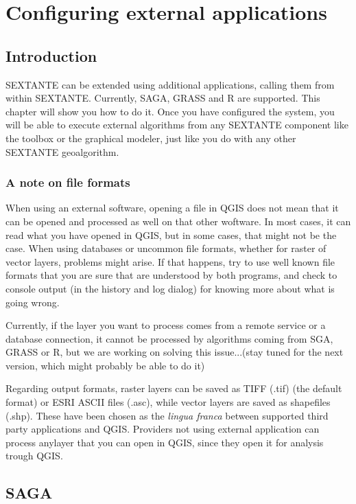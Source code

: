 \chapter{Configuring external applications}

\section{Introduction}

SEXTANTE can be extended using additional applications, calling them from within SEXTANTE. Currently, SAGA, GRASS and R are supported. This chapter will show you how to do it. Once you have configured the system, you will be able to execute external algorithms from any SEXTANTE component like the toolbox or the graphical modeler, just like you do with any other SEXTANTE geoalgorithm.

\subsection{A note on file formats}

When using an external software, opening a file in QGIS does not mean that it can be opened and processed as well on that other woftware. In most cases, it can read what you have opened in QGIS, but in some cases, that might not be the case. When using databases or uncommon file formats, whether for raster of vector layers, problems might arise. If that happens, try to use well known file formats that you are sure that are understood by both programs, and check to console output (in the history and log dialog) for knowing more about what is going wrong.

Currently, if the layer you want to process comes from a remote service or a database connection, it cannot be processed by algorithms coming from SGA, GRASS or R, but we are working on solving this issue...(stay tuned for the next version, which might probably be able to do it)

Regarding output formats, raster layers can be saved as TIFF (.tif) (the default format) or ESRI ASCII files (.asc), while vector layers are saved as shapefiles (.shp). These have been chosen as the \emph{lingua franca} between supported third party applications and QGIS. Providers not using external application can process anylayer that you can open in QGIS, since they open it for analysis trough QGIS.


\section{SAGA}

